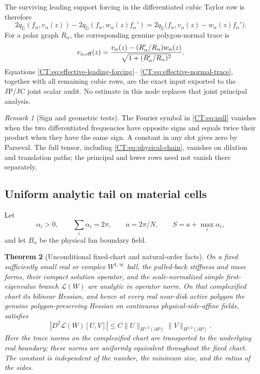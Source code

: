 \documentclass[11pt]{amsart}
\numberwithin{equation}{section}
\newtheorem{theorem}{Theorem}[section]
\theoremstyle{definition}
\theoremstyle{remark}
\newtheorem{remark}[theorem]{Remark}
\newcommand{\qD}{q_{\mathbb D}}
\begin{document}
The surviving leading support forcing in the differentiated cubic Taylor
row is therefore
\begin{equation}\label{CT:eq:effective-leading-forcing}
 2\qD(f_\alpha,v_\alpha(z))
 -2\qD(f_\alpha,w_\alpha(z)f_\alpha')
 =2\qD\bigl(f_\alpha,
     v_\alpha(z)-w_\alpha(z)f_\alpha'\bigr).
\end{equation}
For a polar graph $R_\alpha$, the corresponding genuine polygon-normal
trace is
\begin{equation}\label{CT:eq:effective-normal-trace}
 v_{\alpha,{\rm eff}}(z)
 =\frac{v_\alpha(z)-(R_\alpha'/R_\alpha)w_\alpha(z)}
        {\sqrt{1+(R_\alpha'/R_\alpha)^2}}.
\end{equation}
Equations \eqref{CT:eq:effective-leading-forcing}--
\eqref{CT:eq:effective-normal-trace}, together with all remaining cubic rows,
are the exact input exported to the JP/JC joint scalar audit.  No estimate
in this node replaces that joint principal analysis.

\begin{remark}[Sign and geometric tests]
The Fourier symbol in \eqref{CT:eq:null} vanishes when the two differentiated
frequencies have opposite signs and equals twice their product when they
have the same sign.  A constant in any slot gives zero by Parseval.  The
full tensor, including \eqref{CT:eq:physical-chain}, vanishes on dilation and
translation paths; the principal and lower rows need not vanish there
separately.
\end{remark}

\subsection{Uniform analytic tail on material cells}
\label{CT:sec:material}

Let
\begin{equation}\label{CT:eq:fan}
 \alpha_i>0,\qquad \sum_i\alpha_i=2\pi,\qquad
 a=2\pi/N,\qquad S=a+\max_i\alpha_i,
\end{equation}
and let $B_\alpha$ be the physical fan boundary field.

\begin{theorem}[Unconditional fixed-chart and natural-order facts]
\label{CT:thm:fixed-chart-unconditional}
On a fixed sufficiently small real or complex $W^{1,\infty}$ ball, the
pulled-back stiffness and mass forms, their compact solution operator, and
the scale-normalized simple first-eigenvalue branch $\mathcal L(W)$ are
analytic in operator norm.  On that complexified chart its bilinear
Hessian, and hence at every real near-disk active polygon the genuine
polygon-preserving Hessian on continuous physical-side-affine fields,
satisfies
\begin{equation}\label{CT:eq:polygon-natural-Hessian}
 |D^2\mathcal L(W)[U,V]|
 \le C\|U\|_{H^{1/2}(\partial P)}
       \|V\|_{H^{1/2}(\partial P)}.
\end{equation}
Here the trace norms on the complexified chart are transported to the
underlying real boundary; these norms are uniformly equivalent throughout
the fixed chart.
The constant is independent of the number, the minimum size, and the
ratios of the sides.
\end{theorem}
\end{document}
